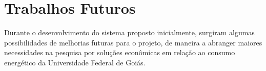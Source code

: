 \chapter{Trabalhos Futuros}
\label{c:trabalhos_futuros}

Durante o desenvolvimento do sistema proposto inicialmente, surgiram algumas possibilidades de melhorias futuras para o projeto, de maneira a abranger maiores necessidades na pesquisa por soluções econômicas em relação ao consumo energético da Universidade Federal de Goiás.

